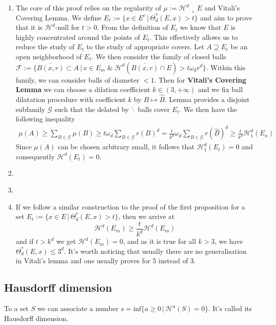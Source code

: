 \vspace{1ex}
\begin{enumerate}
    \item The core of this proof relies on the regularity of $\mu:=\mathcal H^d\,
        \llcorner E$ and Vitali's Covering Lemma. We define $E_t:=\{x\in E^c\,|\,\Theta^*_d(E,x)>t\}$
        and aim to prove that it is $\mathcal H^d$-null for $t>0$. From the
        definition of $E_t$ we know that $E$ is highly concentrated around the
        points of $E_t$. This effectively allows us to reduce the study of $E_t$ to
        the study of appropriate covers. Let $A\supseteq E_t$ be an open neighborhood of $E_t$.
        We then consider the family of closed balls $\mathcal F:=\{\overline{B(x,r)}\subset A\,|\,x\in E_m\;\&
        \;\mathcal H^d(\overline{B(x,r)}\cap E)>t\omega_dr^d\}$. Within this family,
        we can consider balls of diameter $<1$. Then for \textbf{Vitali's
        Covering Lemma} we can choose a dilation coefficient $k\in(3,+\infty)$
        and we fix ball dilatation procedure with coefficient $k$ by $B\mapsto
        \widehat B$. Lemma provides a disjoint subfamily $\mathcal G$ such that
        the delated by $\widehat\cdot$ balls cover $E_t$. We then have the following
        inequality
        \begin{align*}
            \mu(A)\geq\sum_{B\in\mathcal G}\mu(B)\geq t\omega_d\sum_{B\in
            \mathcal G}r(B)^d=\frac{t}{k^d}\omega_d\sum_{B\in\mathcal G}r(
            \widehat B)^d\geq\frac{t}{k^d}\mathcal H^d_1(E_n)
        \end{align*}
        Since $\mu(A)$ can be chosen arbitrary small, it follows that $\mathcal
        H^d_1(E_t)=0$ and consequently $\mathcal H^d(E_t)=0$.
    \item \cite{giovanni_alberti}
    \item \cite{giovanni_alberti}
    \item If we follow a similar construction to the proof of the first
        proposition for a set $E_t:=\{x\in E\,|\,\Theta^*_d(E,x)>t\}$, then
        we arrive at
        \[\mathcal H^d(E_m)\geq\frac{t}{k^d}\mathcal H^d(E_m)\]
        and if $t>k^d$ we get $\mathcal H^d(E_m)=0$, and as it is true for all
        $k>3$, we have $\Theta^*_d(E,x)\leq3^d$. It's worth noticing that usually there
        are no generalisation in Vitali's lemma and one usually proves for 5
        instead of 3.
\end{enumerate}

\subsection{Hausdorff dimension}
To a set $S$ we can associate a number $s=\text{inf}\{a\geq 0\,|\,\mathcal{H}^a
(S)=0\}$. It's called its Hausdorff dimension.


